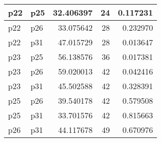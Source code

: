 \begin{table}
\begin{tabular}[t]{l|l|r|r|r}
\hline
p22 & p25 & 32.406397 & 24 & 0.117231\\
\hline
p22 & p26 & 33.075642 & 28 & 0.232970\\
\hline
p22 & p31 & 47.015729 & 28 & 0.013647\\
\hline
p23 & p25 & 56.138576 & 36 & 0.017381\\
\hline
p23 & p26 & 59.020013 & 42 & 0.042416\\
\hline
p23 & p31 & 45.502588 & 42 & 0.328391\\
\hline
p25 & p26 & 39.540178 & 42 & 0.579508\\
\hline
p25 & p31 & 33.701576 & 42 & 0.815663\\
\hline
p26 & p31 & 44.117678 & 49 & 0.670976\\
\hline
\end{tabular}
\end{table}

